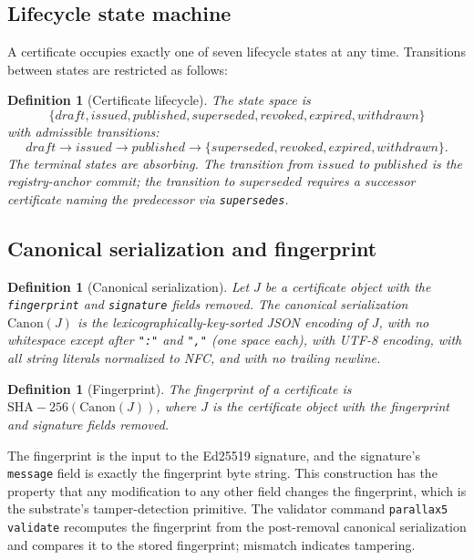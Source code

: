 \documentclass[11pt,a4paper]{article}
\newtheorem{definition}[theorem]{Definition}
\begin{document}
\subsection{Lifecycle state machine}

A certificate occupies exactly one of seven lifecycle states at any time. Transitions between states are restricted as follows:

\begin{definition}[Certificate lifecycle]\label{def:cert-lifecycle}
The state space is
\[
\{\mathit{draft}, \mathit{issued}, \mathit{published}, \mathit{superseded}, \mathit{revoked}, \mathit{expired}, \mathit{withdrawn}\}
\]
with admissible transitions:
\[
\mathit{draft} \to \mathit{issued} \to \mathit{published} \to \{\mathit{superseded}, \mathit{revoked}, \mathit{expired}, \mathit{withdrawn}\}.
\]
The terminal states are absorbing. The transition from $\mathit{issued}$ to $\mathit{published}$ is the registry-anchor commit; the transition to $\mathit{superseded}$ requires a successor certificate naming the predecessor via \texttt{supersedes}.
\end{definition}

\subsection{Canonical serialization and fingerprint}

\begin{definition}[Canonical serialization]\label{def:canon-ser}
Let $J$ be a certificate object with the \texttt{fingerprint} and \texttt{signature} fields removed. The canonical serialization $\mathrm{Canon}(J)$ is the lexicographically-key-sorted JSON encoding of $J$, with no whitespace except after \texttt{":"} and \texttt{","} (one space each), with UTF-8 encoding, with all string literals normalized to NFC, and with no trailing newline.
\end{definition}

\begin{definition}[Fingerprint]\label{def:fingerprint}
The fingerprint of a certificate is $\mathrm{SHA{-}256}(\mathrm{Canon}(J))$, where $J$ is the certificate object with the fingerprint and signature fields removed.
\end{definition}

The fingerprint is the input to the Ed25519 signature, and the signature's \texttt{message} field is exactly the fingerprint byte string. This construction has the property that any modification to any other field changes the fingerprint, which is the substrate's tamper-detection primitive. The validator command \texttt{parallax5 validate} recomputes the fingerprint from the post-removal canonical serialization and compares it to the stored fingerprint; mismatch indicates tampering.
\end{document}
